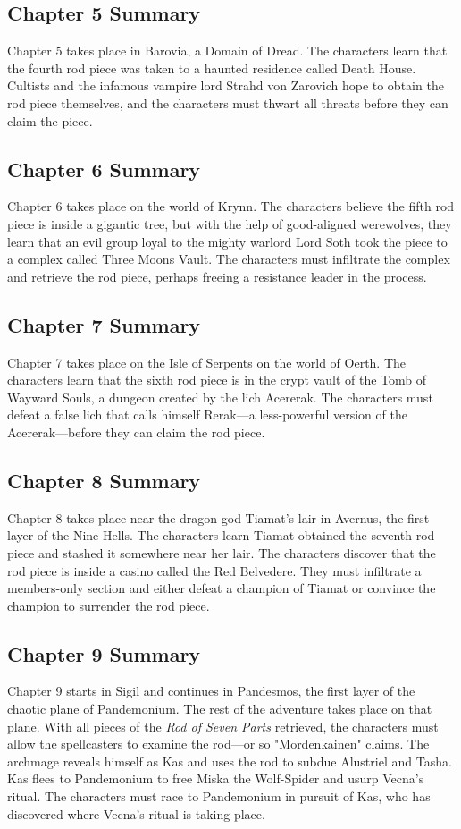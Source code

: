 \documentclass[10pt,a4paper,twoside,bg=print,twocolumn,openany,nodeprecatedcode]{dndbook}
\begin{document}
\subsection{Chapter 5 Summary}
Chapter 5 takes place in Barovia, a Domain of Dread. The characters learn that the fourth rod piece was taken to a haunted residence called Death House. Cultists and the infamous vampire lord Strahd von Zarovich hope to obtain the rod piece themselves, and the characters must thwart all threats before they can claim the piece.

\subsection{Chapter 6 Summary}
Chapter 6 takes place on the world of Krynn. The characters believe the fifth rod piece is inside a gigantic tree, but with the help of good-aligned werewolves, they learn that an evil group loyal to the mighty warlord Lord Soth took the piece to a complex called Three Moons Vault. The characters must infiltrate the complex and retrieve the rod piece, perhaps freeing a resistance leader in the process.

\subsection{Chapter 7 Summary}
Chapter 7 takes place on the Isle of Serpents on the world of Oerth. The characters learn that the sixth rod piece is in the crypt vault of the Tomb of Wayward Souls, a dungeon created by the lich Acererak. The characters must defeat a false lich that calls himself Rerak—a less-powerful version of the Acererak—before they can claim the rod piece.

\subsection{Chapter 8 Summary}
Chapter 8 takes place near the dragon god Tiamat's lair in Avernus, the first layer of the Nine Hells. The characters learn Tiamat obtained the seventh rod piece and stashed it somewhere near her lair. The characters discover that the rod piece is inside a casino called the Red Belvedere. They must infiltrate a members-only section and either defeat a champion of Tiamat or convince the champion to surrender the rod piece.

\subsection{Chapter 9 Summary}
Chapter 9 starts in Sigil and continues in Pandesmos, the first layer of the chaotic plane of Pandemonium. The rest of the adventure takes place on that plane. With all pieces of the \textit{Rod of Seven Parts} retrieved, the characters must allow the spellcasters to examine the rod—or so "Mordenkainen" claims. The archmage reveals himself as Kas and uses the rod to subdue Alustriel and Tasha. Kas flees to Pandemonium to free Miska the Wolf-Spider and usurp Vecna's ritual. The characters must race to Pandemonium in pursuit of Kas, who has discovered where Vecna's ritual is taking place.
\end{document}
